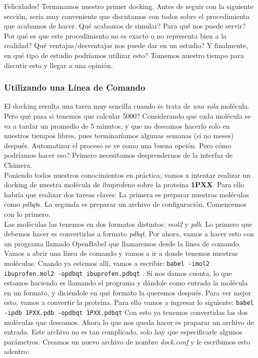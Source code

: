 \documentclass[10pt,letterpaper]{article}
\newcommand{\inlinecode}[1]{
\colorbox{light-gray}{\texttt{#1}}
}
\begin{document}
Felicidades! Terminamos nuestro primer docking. Antes de seguir con la siguiente secci\'on, ser\'ia muy conveniente que discutamos con todos sobre el procedimiento que acabamos de hacer. Qu\'e acabamos de simular? Para qu\'e nos puede servir? Por qu\'e es que este procedimiento no es exacto o no representa bien a la realidad? Qu\'e ventajas/desventajas nos puede dar en un estudio? Y finalmente, en qu\'e tipo de estudio podr\'iamos utilizar esto? Tomemos nuestro tiempo para discutir esto y llegar a una opini\'on.

\subsubsection{Utilizando una L\'inea de Comando}
El docking resulta una tarea muy sencilla cuando se trata de \emph{una sola} mol\'ecula. Pero qu\'e pasa si tenemos que calcular 5000? Considerando que cada mol\'ecula se va a tardar un promedio de 5 minutos, y que no deseamos hacerlo solo en nuestros tiempos libres, pues terminar\'iamos algunas semanas (si no meses) despu\'es. Automatizar el proceso se ve como una buena opci\'on. Pero c\'omo podr\'iamos hacer eso? Primero necesitamos desprendernos de la interfaz de Chimera.\\

Poniendo todos nuestros conocimientos en pr\'actica, vamos a intentar realizar un docking de nuestra mol\'ecula de ibuprofeno sobre la prote\'ina \textbf{1PXX}. Para ello habr\'ia que realizar dos tareas claves: La primera es preparar nuestras mol\'eculas como \textit{pdbqt}s. La segunda es preparar un archivo de configuraci\'on. Comencemos con lo primero.\\

Las mol\'eculas las tenemos en dos formatos distintos: \emph{mol2} y \emph{pdb}. Lo primero que debemos hacer es convertirlas a formato \emph{pdbqt}. Por ahora, vamos a hacer esto con un programa llamado OpenBabel que llamaremos desde la l\'inea de comando. Vamos a abrir una l\'inea de comando y vamos a ir a donde tenemos nuestras mol\'eculas. Cuando ya estemos all\'i, vamos a escribir: \inlinecode{babel -imol2 ibuprofen.mol2 -opdbqt ibuprofen.pdbqt}. Si nos damos cuenta, lo que estamos haciendo es llamando el programa y d\'andole como entrada la mol\'ecula en un formato, y dici\'endole en qu\'e formato la queremos despu\'es. Para ver mejor esto, vamos a convertir la prote\'ina. Para ello vamos a ingresar lo siguiente: \inlinecode{babel -ipdb 1PXX.pdb -opdbqt 1PXX.pdbqt} Con esto ya tenemos convertidas las dos mol\'eculas que deseamos. Ahora lo que nos queda hacer es praparar un archivo de entrada. Este archivo no es tan complicado, solo hay que especificarle algunos par\'ametros. Creamos un nuevo archivo de nombre \emph{dock.conf} y le escribimos esto adentro:
\end{document}
